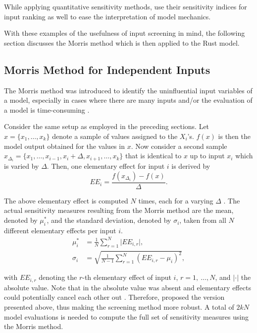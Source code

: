 While applying quantitative sensitivity methods, \citet{HMSW19} use their sensitivity indices for input ranking as well to ease the interpretation of model mechanics.

With these examples of the usefulness of input screening in mind, the following section discusses the Morris method which is then applied to the Rust model.

\subsection{Morris Method for Independent Inputs} \label{classic_morris}

The Morris method was introduced to identify the uninfluential input variables of a model, especially in cases where there are many inputs and/or the evaluation of a model is time-consuming \citep{M91}.

Consider the same setup as employed in the preceding sections. Let $x = \{x_1, \dots, x_k\}$ denote a sample of values assigned to the $X_i$'s. $f(x)$ is then the model output obtained for the values in $x$. Now consider a second sample $x_{\Delta_i} = \{x_1, \dots, x_{i-1}, x_i + \Delta, x_{i+1}, \dots, x_k\}$ that is identical to $x$ up to input $x_i$ which is varied by $\Delta$. Then, one elementary effect for input $i$ is derived by
\begin{equation*}
EE_i = \frac{f(x_{\Delta_i}) - f(x)}{\Delta}.
\end{equation*}

The above elementary effect is computed $N$ times, each for a varying $\Delta$ \citep{GM17}. The actual sensitivity measures resulting from the Morris method are the mean, denoted by $\mu^\ast_i$, and the standard deviation, denoted by $\sigma_i$, taken from all $N$ different elementary effects per input $i$.
\begin{align}
\mu_i^\ast& = \frac{1}{N} \sum_{r=1}^N \vert EE_{i, r} \vert, \label{mu}\\
\sigma_i& = \sqrt{\frac{1}{N-1} \sum_{r=1}^N (EE_{i, r} - \mu_i)^2}, \label{sigma}
\end{align}

\noindent with $EE_{i, r}$ denoting the $r$-th elementary effect of input $i$, $r = 1,\ \dots, N$, and $\vert \cdot \vert$ the absolute value. Note that in \citet{M91} the absolute value was absent and elementary effects could potentially cancel each other out \citep{CCS07}. Therefore, \citet{CCS07} proposed the version presented above, thus making the screening method more robust. A total of $2 k N$ model evaluations is needed to compute the full set of sensitivity measures using the Morris method.

